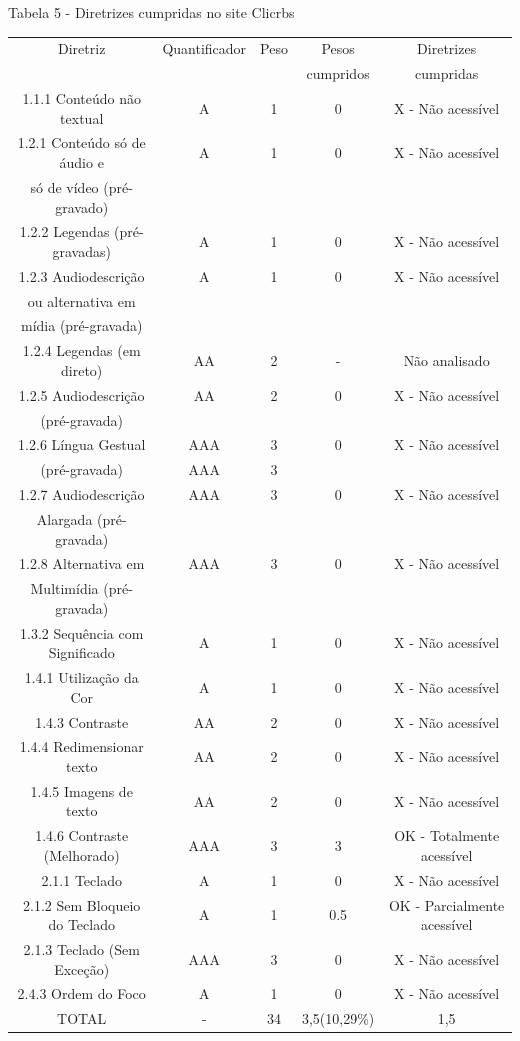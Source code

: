 \documentclass[a4paper]{article}
\begin{document}
\begin{titlepage}
Tabela 5 - Diretrizes cumpridas no site Clicrbs\\[-1cm]
\begin{center}
	\fontsize{8pt}{8pt}\selectfont	
	\begin{longtable}{|c|c|c|c|c|}
		\hline
		Diretriz & Quantificador & Peso & Pesos & Diretrizes\\
		& & & cumpridos & cumpridas\\
		\hline
		1.1.1 Conteúdo não textual & A & 1 & 0 & X - Não acessível\\
		\hline
		1.2.1 Conteúdo só de áudio e & A & 1 & 0 & X - Não acessível\\
		só de vídeo (pré-gravado) & & & &\\
		\hline
		1.2.2 Legendas (pré-gravadas) & A & 1 & 0 & X - Não acessível\\
		\hline
		1.2.3 Audiodescrição & A & 1 & 0 & X - Não acessível\\
		ou alternativa em & & & &\\
		mídia (pré-gravada) & & & &\\
		\hline
		1.2.4 Legendas (em direto) & AA & 2 & - & Não analisado\\
		\hline
		1.2.5 Audiodescrição & AA & 2 & 0 & X - Não acessível\\
		(pré-gravada) & & & &\\
		\hline
		1.2.6 Língua Gestual & AAA & 3 & 0 & X - Não acessível\\
		(pré-gravada) & AAA & 3 & &\\
		\hline
		1.2.7 Audiodescrição & AAA & 3 & 0 & X - Não acessível\\
		Alargada (pré-gravada) & & & &\\
		\hline
		1.2.8 Alternativa em & AAA & 3 & 0 & X - Não acessível\\
		Multimídia (pré-gravada) & & & &\\
		\hline
		1.3.2 Sequência com Significado & A & 1 & 0 & X - Não acessível\\
		\hline
		1.4.1 Utilização da Cor & A & 1 & 0 & X - Não acessível\\
		\hline
		1.4.3 Contraste & AA & 2 & 0 & X - Não acessível\\
		\hline
		1.4.4 Redimensionar texto & AA & 2 & 0 & X - Não acessível\\
		\hline
		1.4.5 Imagens de texto & AA & 2 & 0 & X - Não acessível\\
		\hline
		1.4.6 Contraste (Melhorado) & AAA & 3 & 3 & OK - Totalmente acessível\\
		\hline
		2.1.1 Teclado & A & 1 & 0 & X - Não acessível\\
		\hline
		2.1.2 Sem Bloqueio do Teclado & A & 1 & 0.5 & OK - Parcialmente acessível\\
		\hline
		2.1.3 Teclado (Sem Exceção) & AAA & 3 & 0 & X - Não acessível\\
		\hline
		2.4.3 Ordem do Foco & A & 1 & 0 & X - Não acessível\\
		\hline
		TOTAL & - & 34 & 3,5(10,29\%) & 1,5\\
		\hline
	\end{longtable}
\end{center}


\end{titlepage}
\end{document}
